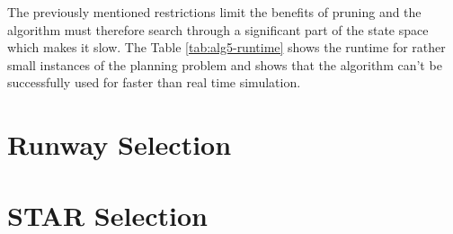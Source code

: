 The previously mentioned restrictions limit the benefits of pruning and the algorithm must therefore search through a significant part of the state space which makes it slow. The Table \ref{tab:alg5-runtime} shows the runtime for rather small instances of the planning problem and shows that the algorithm can't be successfully used for faster than real time simulation.

\section{Runway Selection}

\section{STAR Selection}
